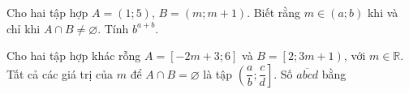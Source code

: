 \begin{ex}%
	Cho hai tập hợp $A=(1;5)$, $B=(m;m+1)$. Biết rằng $m\in (a;b)$ khi và chỉ khi $A\cap B \ne \varnothing $. Tính $b^{a+b}$.
\end{ex}

\begin{ex}%
	Cho hai tập hợp khác rỗng $A=\left[-2m+3;6\right]$ và $B=\left[2;3m+1\right)$, với $m\in\mathbb{R}$. Tất cả các giá trị của $m$ để $A\cap B=\varnothing$ là tập $\left(\dfrac{a}{b};\dfrac{c}{d}\right] $. Số $\overline{abcd}$ bằng
\end{ex}

